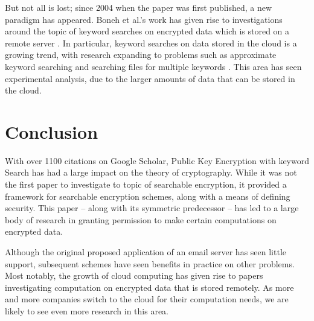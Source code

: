 \documentclass[a4paper,11pt]{article}
\begin{document}
    But not all is lost; since 2004 when the paper was first published, a new paradigm has appeared. Boneh et al.'s work has given rise to investigations around the topic of keyword searches on encrypted data which is stored on a remote server \cite{chang:remote}. In particular, keyword searches on data stored in the cloud is a growing trend, with research expanding to problems such as approximate keyword searching \cite{5462196} and searching files for multiple keywords \cite{6674958}. This area has seen experimental analysis, due to the larger amounts of data that can be stored in the cloud.

    \section{Conclusion}
    \label{conclusion}

    With over 1100 citations on Google Scholar, Public Key Encryption with keyword Search has had a large impact on the theory of cryptography. While it was not the first paper to investigate to topic of searchable encryption, it provided a framework for searchable encryption schemes, along with a means of defining security. This paper -- along with its symmetric predecessor -- has led to a large body of research in granting permission to make certain computations on encrypted data.

    Although the original proposed application of an email server has seen little support, subsequent schemes have seen benefits in practice on other problems. Most notably, the growth of cloud computing has given rise to papers investigating computation on encrypted data that is stored remotely. As more and more companies switch to the cloud for their computation needs, we are likely to see even more research in this area.

    
\end{document}
